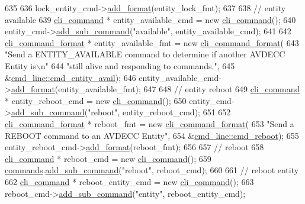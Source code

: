 \begin{DoxyCode}
635 
636     lock\_entity\_cmd->\hyperlink{classcli__command_aa9ec38e761644d946f8db2b920e39921}{add\_format}(entity\_lock\_fmt);
637 
638     \textcolor{comment}{// entity available}
639     \hyperlink{classcli__command}{cli\_command} * entity\_available\_cmd = \textcolor{keyword}{new} \hyperlink{classcli__command}{cli\_command}();
640     entity\_cmd->\hyperlink{classcli__command_aa73a67e8ebb6facd4b40ced66279b226}{add\_sub\_command}(\textcolor{stringliteral}{"available"}, entity\_available\_cmd);
641 
642     \hyperlink{classcli__command__format}{cli\_command\_format} * entity\_available\_fmt = \textcolor{keyword}{new} 
      \hyperlink{classcli__command__format}{cli\_command\_format}(
643         \textcolor{stringliteral}{"Send a ENTITY\_AVAILABLE command to determine if another AVDECC Entity is\(\backslash\)n"}
644         \textcolor{stringliteral}{"still alive and responding to commands."},
645         &\hyperlink{classcmd__line_ac075cd96d2688c183de85fbe92a8e9d2}{cmd\_line::cmd\_entity\_avail});
646     entity\_available\_cmd->\hyperlink{classcli__command_aa9ec38e761644d946f8db2b920e39921}{add\_format}(entity\_available\_fmt);
647 
648     \textcolor{comment}{// entity reboot}
649     \hyperlink{classcli__command}{cli\_command} * entity\_reboot\_cmd = \textcolor{keyword}{new} \hyperlink{classcli__command}{cli\_command}();
650     entity\_cmd->\hyperlink{classcli__command_aa73a67e8ebb6facd4b40ced66279b226}{add\_sub\_command}(\textcolor{stringliteral}{"reboot"}, entity\_reboot\_cmd);
651 
652     \hyperlink{classcli__command__format}{cli\_command\_format} * reboot\_fmt = \textcolor{keyword}{new} \hyperlink{classcli__command__format}{cli\_command\_format}(
653         \textcolor{stringliteral}{"Send a REBOOT command to an AVDECC Entity"},
654         &\hyperlink{classcmd__line_a507353a665b5d1b1ea291ae5dcc7f8a0}{cmd\_line::cmd\_reboot});
655     entity\_reboot\_cmd->\hyperlink{classcli__command_aa9ec38e761644d946f8db2b920e39921}{add\_format}(reboot\_fmt);
656 
657     \textcolor{comment}{// reboot}
658     \hyperlink{classcli__command}{cli\_command} * reboot\_cmd = \textcolor{keyword}{new} \hyperlink{classcli__command}{cli\_command}();
659     \hyperlink{classcmd__line_ae4fea670c2fdd2b60f7b5b6ad6fbaf1e}{commands}.\hyperlink{classcli__command_aa73a67e8ebb6facd4b40ced66279b226}{add\_sub\_command}(\textcolor{stringliteral}{"reboot"}, reboot\_cmd);
660 
661     \textcolor{comment}{// reboot entity}
662     \hyperlink{classcli__command}{cli\_command} * reboot\_entity\_cmd = \textcolor{keyword}{new} \hyperlink{classcli__command}{cli\_command}();
663     reboot\_cmd->\hyperlink{classcli__command_aa73a67e8ebb6facd4b40ced66279b226}{add\_sub\_command}(\textcolor{stringliteral}{"entity"}, reboot\_entity\_cmd);

\end{DoxyCode}

